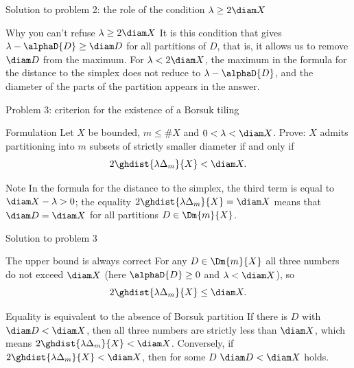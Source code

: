 \documentclass[aspectratio=169,11pt]{beamer}
\begin{document}
\begin{frame}{Solution to problem \textup{2}: the role of the condition $\lambda \ge 2\diam X$}
\begin{block}{Why you can't refuse $\lambda \ge 2\diam X$}
It is this condition that gives $\lambda - \alphaD{D} \ge \diam D$ for all partitions of $D$, that is, it allows us to remove $\diam D$ from the maximum. For $\lambda < 2\diam X$, the maximum in the formula for the distance to the simplex does not reduce to $\lambda - \alphaD{D}$, and the diameter of the parts of the partition appears in the answer.
\end{block}
\end{frame}

\begin{frame}{Problem \textup{3}: criterion for the existence of a Borsuk tiling}
\begin{block}{Formulation}
Let $X$ be bounded, $m \le \#X$ and $0 < \lambda < \diam X$. Prove\textup{:} $X$ admits partitioning into $m$ subsets of strictly smaller diameter if and only if
\[
2 \ghdist{\lambda\Delta_m}{X} < \diam X.
\]
\end{block}
\begin{block}{Note}
In the formula for the distance to the simplex, the third term is equal to $\diam X - \lambda > 0$\textup{;} the equality $2\ghdist{\lambda\Delta_m}{X} = \diam X$ means that $\diam D = \diam X$ for all partitions $D \in \Dm{m}{X}$.
\end{block}
\end{frame}

\begin{frame}{Solution to problem \textup{3}}
\begin{block}{The upper bound is always correct}
For any $D \in \Dm{m}{X}$ all three numbers do not exceed $\diam X$ (here $\alphaD{D} \ge 0$ and $\lambda < \diam X$), so
\[
2\ghdist{\lambda\Delta_m}{X} \le \diam X .
\]
\end{block}
\begin{block}{Equality is equivalent to the absence of Borsuk partition}
If there is $D$ with $\diam D < \diam X$, then all three numbers are strictly less than $\diam X$, which means $2\ghdist{\lambda\Delta_m}{X} < \diam X$. Conversely, if $2\ghdist{\lambda\Delta_m}{X} < \diam X$, then for some $D$ $\diam D < \diam X$ holds.
\end{block}
\end{frame}
\end{document}
